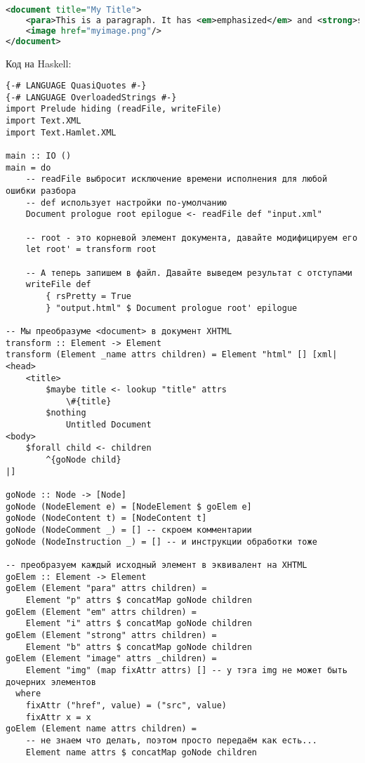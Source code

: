 \begin{lstlisting}[language=XML]
<document title="My Title">
    <para>This is a paragraph. It has <em>emphasized</em> and <strong>strong</strong> words.</para>
    <image href="myimage.png"/>
</document>
\end{lstlisting}

Код на Haskell:

\begin{lstlisting}
{-# LANGUAGE QuasiQuotes #-}
{-# LANGUAGE OverloadedStrings #-}
import Prelude hiding (readFile, writeFile)
import Text.XML
import Text.Hamlet.XML

main :: IO ()
main = do
    -- readFile выбросит исключение времени исполнения для любой ошибки разбора
    -- def использует настройки по-умолчанию
    Document prologue root epilogue <- readFile def "input.xml"

    -- root - это корневой элемент документа, давайте модифицируем его
    let root' = transform root

    -- А теперь запишем в файл. Давайте выведем результат с отступами
    writeFile def
        { rsPretty = True
        } "output.html" $ Document prologue root' epilogue

-- Мы преобразуме <document> в документ XHTML
transform :: Element -> Element
transform (Element _name attrs children) = Element "html" [] [xml|
<head>
    <title>
        $maybe title <- lookup "title" attrs
            \#{title}
        $nothing
            Untitled Document
<body>
    $forall child <- children
        ^{goNode child}
|]

goNode :: Node -> [Node]
goNode (NodeElement e) = [NodeElement $ goElem e]
goNode (NodeContent t) = [NodeContent t]
goNode (NodeComment _) = [] -- скроем комментарии
goNode (NodeInstruction _) = [] -- и инструкции обработки тоже

-- преобразуем каждый исходный элемент в эквивалент на XHTML
goElem :: Element -> Element
goElem (Element "para" attrs children) =
    Element "p" attrs $ concatMap goNode children
goElem (Element "em" attrs children) =
    Element "i" attrs $ concatMap goNode children
goElem (Element "strong" attrs children) =
    Element "b" attrs $ concatMap goNode children
goElem (Element "image" attrs _children) =
    Element "img" (map fixAttr attrs) [] -- у тэга img не может быть дочерних элементов
  where
    fixAttr ("href", value) = ("src", value)
    fixAttr x = x
goElem (Element name attrs children) =
    -- не знаем что делать, поэтом просто передаём как есть...
    Element name attrs $ concatMap goNode children
\end{lstlisting}%

